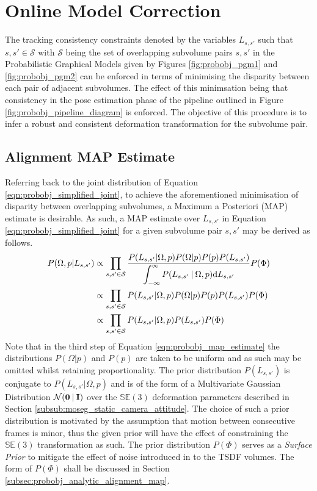 \section{Online Model Correction}
\label{sec:probobj_model_correction}
The tracking consistency constraints denoted by the variables $L_{s, s'}$ such
that $s, s' \in \mathcal{S}$ with $\mathcal{S}$ being the set of overlapping
subvolume pairs $s, s'$ in the Probabilistic Graphical Models given by Figures
\ref{fig:probobj_pgm1} and \ref{fig:probobj_pgm2} can be enforced in terms of
minimising the disparity between each pair of adjacent subvolumes. The effect of
this minimsation being that consistency in the pose estimation phase of the
pipeline outlined in Figure \ref{fig:probobj_pipeline_diagram} is enforced. The
objective of this procedure is to infer a robust and consistent deformation
transformation for the subvolume pair.

\subsection{Alignment MAP Estimate}
\label{subsec:probobj_alignment_map}
Referring back to the joint distribution of Equation \ref{eqn:probobj_simplified_joint}, 
to achieve the aforementioned minimisation of disparity between overlapping subvolumes, 
a Maximum a Posteriori (MAP) estimate is desirable. As such, a MAP estimate over $L_{s, s'}$ 
in Equation \ref{eqn:probobj_simplified_joint} for a given subvolume pair $s, s'$ may be
derived as follows.
\begin{align}
  \label{eqn:probobj_map_estimate}
  P(\Omega, p | L_{s, s'}) & \propto \prod_{s, s' \in \mathcal{S}}
  \frac{P(L_{s, s'} | \Omega, p) 
  P(\Omega | p)P(p)P(L_{s, s'})}
  {\displaystyle\int_{-\infty}^{\infty} P(L_{s, s'} \:\vert\: \Omega, p)
  {\mathrm d{L_{s, s'}}}} P(\Phi) \\
  & \propto \prod_{s, s' \in \mathcal{S}} P(L_{s, s'} | \Omega, p) P(\Omega | p)
  P(p)P(L_{s, s'})P(\Phi) \\
  & \propto \prod_{s, s' \in \mathcal{S}} P(L_{s, s'} | \Omega, p)P(L_{s, s'})
  P(\Phi)
\end{align}
Note that in the third step of Equation \ref{eqn:probobj_map_estimate} the
distributions $P(\Omega | p)$ and $P(p)$ are taken to be uniform and as such may
be omitted whilst retaining proportionality. The prior distribution $P(L_{s, s'})$ is
conjugate to $P(L_{s, s'} | \Omega, p)$ and is of the form of a Multivariate
Gaussian Distribution $\mathcal{N}(\mathbf{0} \:\vert\: \mathbf{I})$ over the
$\mathbb{SE}(3)$ deformation parameters described in Section 
\ref{subsub:moseg_static_camera_attitude}. The choice of such a prior distribution
is motivated by the assumption that motion between consecutive frames is minor,
thus the given prior will have the effect of constraining the $\mathbb{SE}(3)$
transformation as such. The prior distribution $P(\Phi)$ serves as a
\textit{Surface Prior} to mitigate the effect of noise introduced in to the TSDF
volumes. The form of $P(\Phi)$ shall be discussed in Section
\ref{subsec:probobj_analytic_alignment_map}.

